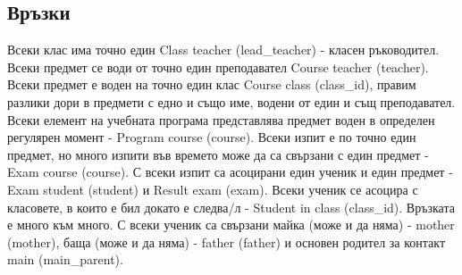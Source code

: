 \documentclass[a4paper, 12pt, x11names]{article}
\begin{document}
\subsection{Връзки}
Всеки клас има точно един Class teacher (lead\_teacher) - класен ръководител.
Всеки предмет се води от точно един преподавател Course teacher (teacher).
Всеки предмет е воден на точно един клас Course class (class\_id),
правим разлики дори в предмети с едно и също име, водени от един и същ преподавател.
Всеки елемент на учебната програма представлява предмет воден в определен регулярен момент - Program course (course).
Всеки изпит е по точно един предмет, но много изпити във времето може да са свързани с един предмет - Exam course (course).
С всеки изпит са асоцирани един ученик и един предмет - Exam student (student) и Result exam (exam).
Всеки ученик се асоцира с класовете, в които е бил докато е следва/л - Student in class (class\_id). Връзката е много към много.
С всеки ученик са свързани майка (може и да няма) - mother (mother), баща (може и да няма) - father (father) и основен родител за контакт main (main\_parent).
\end{document}
